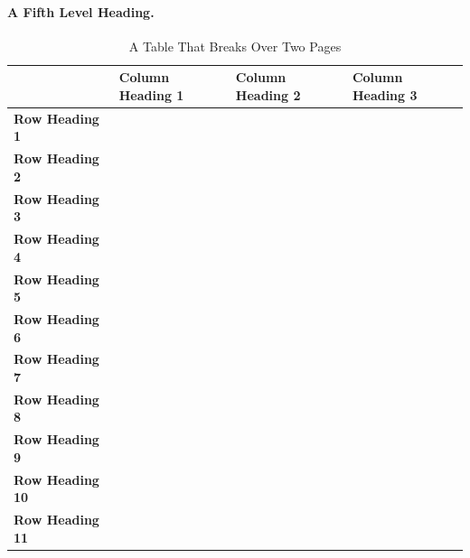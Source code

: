 \paragraph{A Fifth Level Heading. } \lipsum[11]

\vspace{2\baselineskip}
\begin{table}[hp!]
\caption{A Table That Breaks Over Two Pages}
\begin{tabular}{l|l|l|l|}
\cline{2-4}
                                              & \textbf{Column Heading 1} & \textbf{Column Heading 2} & \textbf{Column Heading 3} \\ \hline
\multicolumn{1}{|l|}{\textbf{Row Heading 1}}  &                           &                           &                           \\ \hline
\multicolumn{1}{|l|}{\textbf{Row Heading 2}}  &                           &                           &                           \\ \hline
\multicolumn{1}{|l|}{\textbf{Row Heading 3}}  &                           &                           &                           \\ \hline
\multicolumn{1}{|l|}{\textbf{Row Heading 4}}  &                           &                           &                           \\ \hline
\multicolumn{1}{|l|}{\textbf{Row Heading 5}}  &                           &                           &                           \\ \hline
\multicolumn{1}{|l|}{\textbf{Row Heading 6}}  &                           &                           &                           \\ \hline
\multicolumn{1}{|l|}{\textbf{Row Heading 7}}  &                           &                           &                           \\ \hline
\multicolumn{1}{|l|}{\textbf{Row Heading 8}}  &                           &                           &                           \\ \hline
\multicolumn{1}{|l|}{\textbf{Row Heading 9}}  &                           &                           &                           \\ \hline
\multicolumn{1}{|l|}{\textbf{Row Heading 10}} &                           &                           &                           \\ \hline
\multicolumn{1}{|l|}{\textbf{Row Heading 11}} &                           &                           &                           \\ \hline
\end{tabular}
\end{table}
\FloatBarrier


